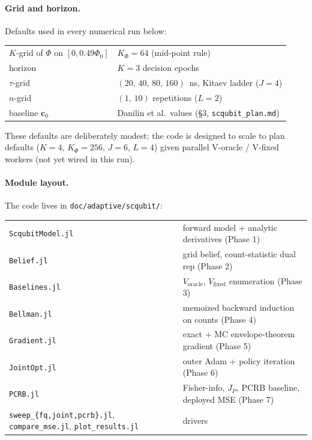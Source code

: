 \documentclass[11pt,a4paper]{article}
\newcommand{\Phizero}{\Phi_0}
\begin{document}
\paragraph{Grid and horizon.}  Defaults used in every numerical run below:
\begin{center}
\begin{tabular}{@{}ll@{}}
\toprule
$K$-grid of $\Phi$ on $[0, 0.49\Phizero]$ & $K_\Phi = 64$ (mid-point rule) \\
horizon & $K = 3$ decision epochs \\
$\tau$-grid & $(20,\,40,\,80,\,160)$~ns, Kitaev ladder ($J = 4$) \\
$n$-grid & $(1,\,10)$ repetitions ($L = 2$) \\
baseline $\bm c_0$ & Danilin et al.\ values (\S3, \texttt{scqubit\_plan.md}) \\
\bottomrule
\end{tabular}
\end{center}
These defaults are deliberately modest; the code is designed to scale to plan defaults ($K=4$, $K_\Phi=256$, $J=6$, $L=4$) given parallel V-oracle / V-fixed workers (not yet wired in this run).

\paragraph{Module layout.}  The code lives in \texttt{doc/adaptive/scqubit/}:
\begin{center}
\begin{tabular}{@{}ll@{}}
\toprule
\texttt{ScqubitModel.jl} & forward model + analytic derivatives (Phase 1) \\
\texttt{Belief.jl}       & grid belief, count-statistic dual rep (Phase 2) \\
\texttt{Baselines.jl}    & $V_{\text{oracle}}$, $V_{\text{fixed}}$ enumeration (Phase 3) \\
\texttt{Bellman.jl}      & memoized backward induction on counts (Phase 4) \\
\texttt{Gradient.jl}     & exact + MC envelope-theorem gradient (Phase 5) \\
\texttt{JointOpt.jl}     & outer Adam + policy iteration (Phase 6) \\
\texttt{PCRB.jl}         & Fisher-info, $J_P$, PCRB baseline, deployed MSE (Phase 7) \\
\texttt{sweep\_\{fq,joint,pcrb\}.jl}, \texttt{compare\_mse.jl}, \texttt{plot\_results.jl} & drivers \\
\bottomrule
\end{tabular}
\end{center}
\end{document}
